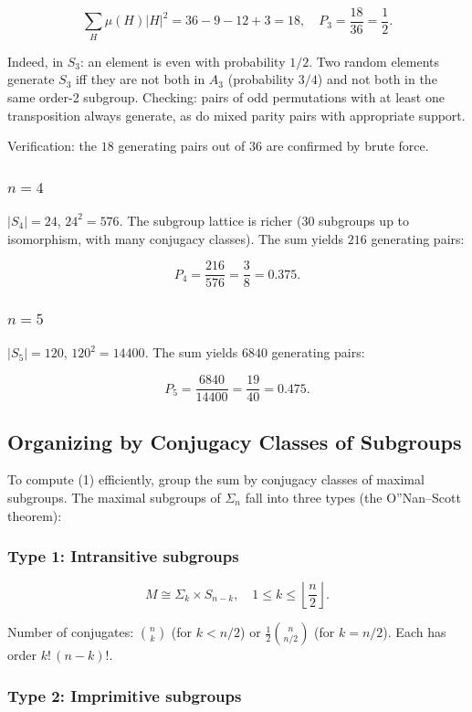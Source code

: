 \documentclass[12pt,a4paper]{article}
\begin{document}
\[\sum_H \mu(H)|H|^2 = 36 - 9 - 12 + 3 = 18, \quad P_3 = \frac{18}{36} = \frac{1}{2}.\]

Indeed, in $S_3$: an element is even with probability $1/2$. Two random elements generate
$S_3$ iff they are not both in $A_3$ (probability $3/4$) and not both in the same order-2
subgroup. Checking: pairs of odd permutations with at least one transposition always generate,
as do mixed parity pairs with appropriate support.

Verification: the $18$ generating pairs out of $36$ are confirmed by brute force.

\subsubsection{$n = 4$}

$|S_4| = 24$, $24^2 = 576$. The subgroup lattice is richer (30 subgroups up to
isomorphism, with many conjugacy classes). The sum yields $216$ generating pairs:

\[P_4 = \frac{216}{576} = \frac{3}{8} = 0.375.\]

\subsubsection{$n = 5$}

$|S_5| = 120$, $120^2 = 14400$. The sum yields $6840$ generating pairs:

\[P_5 = \frac{6840}{14400} = \frac{19}{40} = 0.475.\]

\subsection{Organizing by Conjugacy Classes of Subgroups}

To compute (1) efficiently, group the sum by conjugacy classes of maximal subgroups.
The maximal subgroups of $Σ_n$ fall into three types (the O''Nan--Scott theorem):

\subsubsection{Type 1: Intransitive subgroups}

\[M \cong Σ_k \times S_{n-k}, \quad 1 \leq k \leq \left\lfloor\frac{n}{2}\right\rfloor.\]


Number of conjugates: $\binom{n}{k}$ (for $k < n/2$) or $\frac{1}{2}\binom{n}{n/2}$ (for $k = n/2$).
Each has order $k! \,(n-k)!$.

\subsubsection{Type 2: Imprimitive subgroups}
\end{document}
